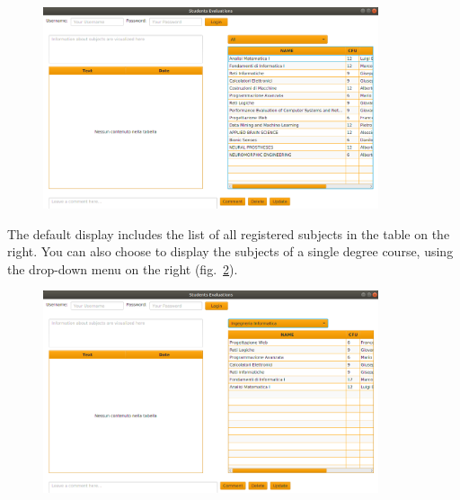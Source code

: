\documentclass[a4paper]{article}
\begin{document}
\begin{figure}[h]
\centering
\includegraphics[width=0.88\textwidth]{images/screens/screen0}
\label{fig:screen0}
\end{figure}

The default display includes the list of all registered subjects in the table on the right. You can also choose to display the subjects of a single degree course, using the drop-down menu on the right (fig.~\ref{fig:screen1}).

\begin{figure}[h]
\centering
\includegraphics[width=0.88\textwidth]{images/screens/screen1}
\label{fig:screen1}
\end{figure}
\clearpage
\end{document}

